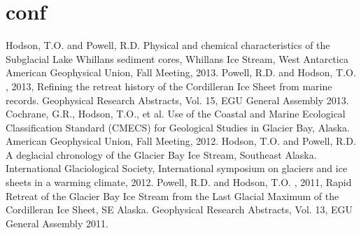 \section{conf}

Hodson, T.O. and Powell, R.D. Physical and chemical characteristics of the Subglacial Lake Whillans sediment cores, Whillans Ice Stream, West Antarctica American Geophysical Union, Fall Meeting, 2013.
Powell, R.D. and Hodson, T.O. , 2013, Refining the retreat history of the Cordilleran Ice Sheet from marine records. Geophysical Research Abstracts, Vol. 15, EGU General Assembly 2013.
Cochrane, G.R., Hodson, T.O., et al. Use of the Coastal and Marine Ecological Classification Standard (CMECS) for Geological Studies in Glacier Bay, Alaska. American Geophysical Union, Fall Meeting, 2012.
Hodson, T.O. and Powell, R.D. A deglacial chronology of the Glacier Bay Ice Stream, Southeast Alaska. International Glaciological Society, International symposium on glaciers and ice sheets in a warming climate, 2012.
Powell, R.D. and Hodson, T.O. , 2011, Rapid Retreat of the Glacier Bay Ice Stream from the Last Glacial Maximum of the Cordilleran Ice Sheet, SE Alaska. Geophysical Research Abstracts, Vol. 13, EGU General Assembly 2011.

